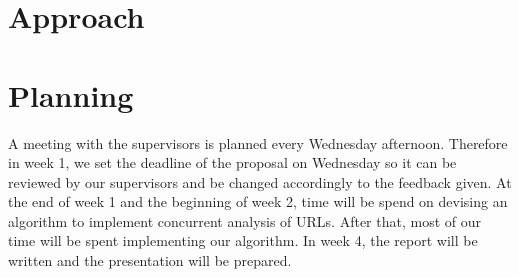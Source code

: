 \documentclass{scrartcl}
\begin{document}


\section{Approach}






\section{Planning}

A meeting with the supervisors is planned every Wednesday afternoon. Therefore in week 1, we set the deadline of the proposal on Wednesday so it can be reviewed by our supervisors and be changed accordingly to the feedback given. At the end of week 1 and the beginning of week 2, time will be spend on devising an algorithm to implement concurrent analysis of URLs. After that, most of our time will be spent implementing our algorithm. In week 4, the report will be written and the presentation will be prepared.
\end{document}
